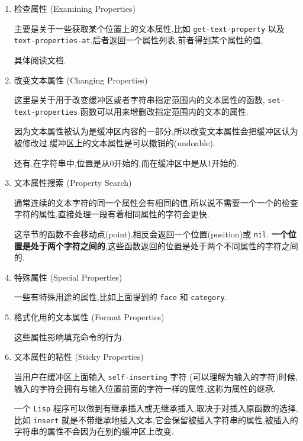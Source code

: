 \documentclass[11pt]{article}
\begin{document}
\begin{enumerate}
\item 检查属性 (Examining Properties)
\label{sec:org83c2b85}

主要是关于一些获取某个位置上的文本属性,比如 \texttt{get-text-property} 以及 \texttt{text-properties-at},后者返回一个属性列表,前者得到某个属性的值,

具体阅读文档.


\item 改变文本属性 (Changing Properties)
\label{sec:org4968d6d}

这里是关于用于改变缓冲区或者字符串指定范围内的文本属性的函数, \texttt{set-text-properties} 函数可以用来增删改指定范围内的文本的属性.

因为文本属性被认为是缓冲区内容的一部分,所以改变文本属性会把缓冲区认为被修改过.缓冲区上的文本属性是可以撤销的(undoable).

还有,在字符串中,位置是从0开始的,而在缓冲区中是从1开始的.



\item 文本属性搜索 (Property Search)
\label{sec:orgdd1fe1d}

通常连续的文本字符的同一个属性会有相同的值,所以说不需要一个一个的检查字符的属性,直接处理一段有着相同属性的字符会更快.

这章节的函数不会移动点(point),相反会返回一个位置(position)或 \texttt{nil}. \textbf{一个位置是处于两个字符之间的},这些函数返回的位置是处于两个不同属性的字符之间的.


\item 特殊属性 (Special Properties)
\label{sec:org54560b1}

一些有特殊用途的属性,比如上面提到的 \texttt{face} 和 \texttt{category}.


\item 格式化用的文本属性 (Format Properties)
\label{sec:orgaa223d5}

这些属性影响填充命令的行为.


\item 文本属性的粘性 (Sticky Properties)
\label{sec:org008c6d3}

当用户在缓冲区上面输入 \texttt{self-inserting} 字符 (可以理解为输入的字符)时候,输入的字符会拥有与输入位置前面的字符一样的属性,这称为属性的继承.

一个 \texttt{Lisp} 程序可以做到有继承插入或无继承插入,取决于对插入原函数的选择,比如 \texttt{insert} 就是不带继承地插入文本,它会保留被插入字符串的属性,被插入的字符串的属性不会因为在别的缓冲区上改变.


\end{enumerate}
\end{document}
